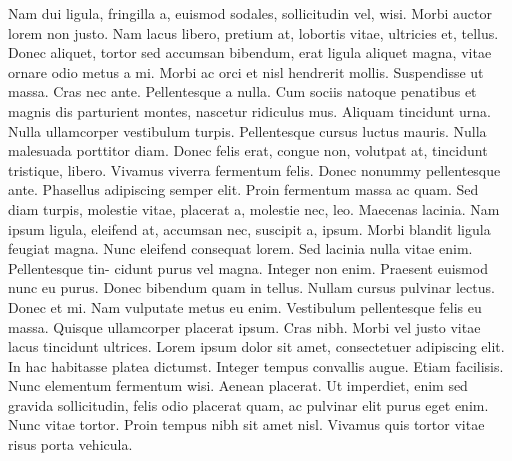 \documentclass{article}
\begin{document}
	Nam dui ligula, fringilla a, euismod sodales, sollicitudin vel, wisi. Morbi auctor lorem non justo.
	Nam lacus libero, pretium at, lobortis vitae, ultricies et, tellus. Donec aliquet, tortor sed accumsan
	bibendum, erat ligula aliquet magna, vitae ornare odio metus a mi. Morbi ac orci et nisl hendrerit
	mollis. Suspendisse ut massa. Cras nec ante. Pellentesque a nulla. Cum sociis natoque penatibus
	et magnis dis parturient montes, nascetur ridiculus mus. Aliquam tincidunt urna. Nulla ullamcorper
	vestibulum turpis. Pellentesque cursus luctus mauris.
	Nulla malesuada porttitor diam. Donec felis erat, congue non, volutpat at, tincidunt tristique, libero.
	Vivamus viverra fermentum felis. Donec nonummy pellentesque ante. Phasellus adipiscing semper
	elit. Proin fermentum massa ac quam. Sed diam turpis, molestie vitae, placerat a, molestie nec, leo.
	Maecenas lacinia. Nam ipsum ligula, eleifend at, accumsan nec, suscipit a, ipsum. Morbi blandit
	ligula feugiat magna. Nunc eleifend consequat lorem. Sed lacinia nulla vitae enim. Pellentesque tin-
	cidunt purus vel magna. Integer non enim. Praesent euismod nunc eu purus. Donec bibendum quam
	in tellus. Nullam cursus pulvinar lectus. Donec et mi. Nam vulputate metus eu enim. Vestibulum
	pellentesque felis eu massa.
	Quisque ullamcorper placerat ipsum. Cras nibh. Morbi vel justo vitae lacus tincidunt ultrices. Lorem
	ipsum dolor sit amet, consectetuer adipiscing elit. In hac habitasse platea dictumst. Integer tempus
	convallis augue. Etiam facilisis. Nunc elementum fermentum wisi. Aenean placerat. Ut imperdiet,
	enim sed gravida sollicitudin, felis odio placerat quam, ac pulvinar elit purus eget enim. Nunc vitae
	tortor. Proin tempus nibh sit amet nisl. Vivamus quis tortor vitae risus porta vehicula.


\clearpage


\end{document}

